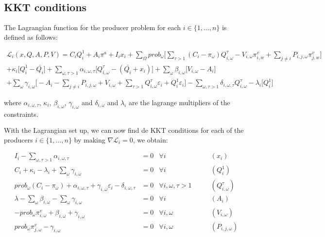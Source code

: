 \documentclass[11pt, letterpaper]{article}
\begin{document}
\subsection{KKT conditions}

The Lagrangian function for the producer problem for each $i \in \{ 1,...,n\}$ is defined as follows:

\begin{multline}
    \mathcal{L}_i(x,Q,A,P,V) = C_i Q_i^{1} + A_i\pi^{a} + I_i x_i + \sum_{\Omega} prob_\omega \Big[ \sum_{\tau>1} (C_i-\pi_{\omega}) Q_{i,\omega}^{\tau} - V_{i,\omega}\pi_{i,w}^v+\sum_{j\neq i} \nonumber P_{i,j,\omega}\pi_{j,w}^v\Big]\\ + \kappa_{i}\Big[Q_{i}^{1} - \bar{Q_i}\Big] +\sum_{\omega,\tau>1} \alpha_{i,\omega,\tau}\Big[Q_{i,\omega}^{\tau} - (\bar{Q_i}+ x_i)\Big] + \sum_{\omega}\beta_{i,\omega}\Big[V_{i,\omega}-A_i\Big] \\
    + \sum_{\omega}\gamma_{i,\omega} \Big[-A_{i} - \sum_{j \neq i}P_{i,j,\omega} + V_{i,\omega}+\sum_{\tau>1}Q_{i, \omega}^{\tau}\varepsilon_{i}+Q_i^{1}\varepsilon_{i}\Big] - \sum_{\omega, \tau>1}\delta_{i,\omega,\tau} Q_{i,\omega}^{\tau} - \lambda_{i}\Big[Q^{1}_{i}\Big]
\end{multline}

where $\alpha_{i,\omega,\tau}$, $\kappa_i$, $\beta_{i,\omega}$, $\gamma_{i,\omega}$ and $\delta_{i,\omega}$ and $\lambda_i$ are the lagrange multipliers of the constraints. 


\smallskip

With the Lagrangian set up, we can now find de KKT conditions for each of the producers $i \in \{ 1,...,n\}$ by making $\nabla \mathcal{L}_{i}=0$, we obtain:

\begin{align}
    I_i - \sum_{\omega,\tau>1} \alpha_{i,\omega,\tau} & = 0 & \forall i  &  \qquad (x_i)\\
    C_{i} + \kappa_i - \lambda_{i} + \sum_{\omega} \gamma_{i,\omega} & = 0 & \forall i  &  \qquad (Q^{1}_{i})\\
    prob_\omega (C_i-\pi_{\omega}) + \alpha_{i,\omega,\tau} + \gamma_{i,\omega} \varepsilon_{i}-\delta_{i,\omega,\tau} & =0 & \forall i, \omega, \tau>1 &  \qquad (Q_{i,\omega}^{\tau})\\
    \lambda - \sum_{\omega}\beta_{i,\omega} - \sum_{\omega}\gamma_{i,\omega} & =0 & \forall i & \qquad (A_{i}) \\
    -prob_\omega \pi^v_{i,\omega} + \beta_{i,\omega}  + \gamma_{i,\omega} & =0 & \forall i, \omega & \qquad (V_{i,\omega}) \\
    prob_\omega \pi^v_{j,\omega} -\gamma_{i,\omega} & = 0 & \forall i, \omega & \qquad (P_{i,j,\omega})
\end{align}
\end{document}
